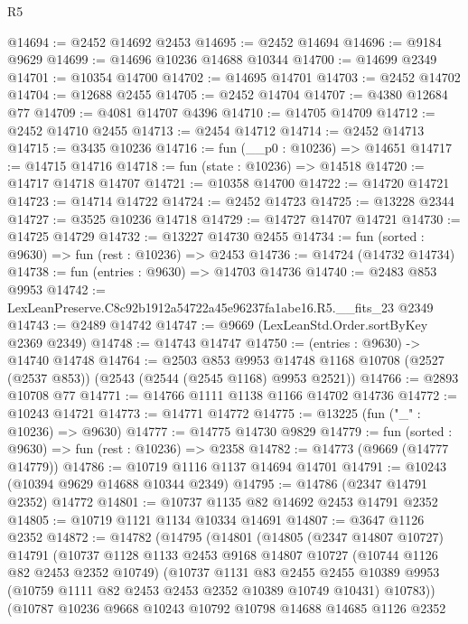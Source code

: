 \begin{lexlean}{R5}
\begin{coremodule}
@14694 := @2452 @14692 @2453
@14695 := @2452 @14694
@14696 := @9184 @9629
@14699 := @14696 @10236 @14688 @10344
@14700 := @14699 @2349
@14701 := @10354 @14700
@14702 := @14695 @14701
@14703 := @2452 @14702
@14704 := @12688 @2455
@14705 := @2452 @14704
@14707 := @4380 @12684 @77
@14709 := @4081 @14707 @4396
@14710 := @14705 @14709
@14712 := @2452 @14710 @2455
@14713 := @2454 @14712
@14714 := @2452 @14713
@14715 := @3435 @10236
@14716 := fun (__p0 : @10236) => @14651
@14717 := @14715 @14716
@14718 := fun (state : @10236) => @14518
@14720 := @14717 @14718 @14707
@14721 := @10358 @14700
@14722 := @14720 @14721
@14723 := @14714 @14722
@14724 := @2452 @14723
@14725 := @13228 @2344
@14727 := @3525 @10236 @14718
@14729 := @14727 @14707 @14721
@14730 := @14725 @14729
@14732 := @13227 @14730 @2455
@14734 := fun (sorted : @9630) => fun (rest : @10236) => @2453
@14736 := @14724 (@14732 @14734)
@14738 := fun (entries : @9630) => @14703 @14736
@14740 := @2483 @853 @9953
@14742 := LexLeanPreserve.C8c92b1912a54722a45e96237fa1abe16.R5.__fits_23 @2349
@14743 := @2489 @14742
@14747 := @9669 (LexLeanStd.Order.sortByKey @2369 @2349)
@14748 := @14743 @14747
@14750 := (entries : @9630) -> @14740 @14748
@14764 := @2503
    @853
    @9953
    @14748
    @1168
    @10708
    (@2527 (@2537 @853))
    (@2543 (@2544 (@2545 @1168) @9953 @2521))
@14766 := @2893 @10708 @77
@14771 := @14766 @1111 @1138 @1166 @14702 @14736
@14772 := @10243 @14721
@14773 := @14771 @14772
@14775 := @13225 (fun ("_" : @10236) => @9630)
@14777 := @14775 @14730 @9829
@14779 := fun (sorted : @9630) => fun (rest : @10236) => @2358
@14782 := @14773 (@9669 (@14777 @14779))
@14786 := @10719 @1116 @1137 @14694 @14701
@14791 := @10243 (@10394 @9629 @14688 @10344 @2349)
@14795 := @14786 (@2347 @14791 @2352) @14772
@14801 := @10737 @1135 @82 @14692 @2453 @14791 @2352
@14805 := @10719 @1121 @1134 @10334 @14691
@14807 := @3647 @1126 @2352
@14872 := @14782
    (@14795
      (@14801
        (@14805
          (@2347 @14807 @10727)
          @14791
          (@10737
            @1128
            @1133
            @2453
            @9168
            @14807
            @10727
            (@10744 @1126 @82 @2453 @2352 @10749)
            (@10737
              @1131
              @83
              @2455
              @2455
              @10389
              @9953
              (@10759 @1111 @82 @2453 @2453 @2352 @10389 @10749 @10431)
              @10783))
          (@10787
            @10236
            @9668
            @10243
            @10792
            @10798
            @14688
            @14685
            @1126
            @2352

\end{coremodule}
\end{lexlean}
